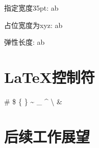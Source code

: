     指定宽度35pt: a\hspace{35pt}b
 
    占位宽度为xyz: a\hphantom{xyz}b
 
    弹性长度: a\hfill b

\section{\LaTeX 控制符}
\#              %
\$              %
\{ \}           %
\~{}            %
\_{}            %
\^{}            %
\textbackslash  %
\&              %


\section{后续工作展望}